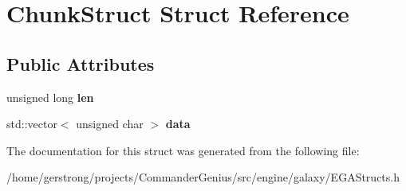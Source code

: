 \hypertarget{struct_chunk_struct}{
\section{ChunkStruct Struct Reference}
\label{struct_chunk_struct}
}
\subsection*{Public Attributes}
\begin{DoxyCompactItemize}
\item 
\hypertarget{struct_chunk_struct_acf187a900b0e64c7457b1a7bc62a237c}{
unsigned long {\bfseries len}}
\label{struct_chunk_struct_acf187a900b0e64c7457b1a7bc62a237c}

\item 
\hypertarget{struct_chunk_struct_a8716ff5252fffbeea42645858d351ab4}{
std::vector$<$ unsigned char $>$ {\bfseries data}}
\label{struct_chunk_struct_a8716ff5252fffbeea42645858d351ab4}

\end{DoxyCompactItemize}


The documentation for this struct was generated from the following file:\begin{DoxyCompactItemize}
\item 
/home/gerstrong/projects/CommanderGenius/src/engine/galaxy/EGAStructs.h\end{DoxyCompactItemize}
